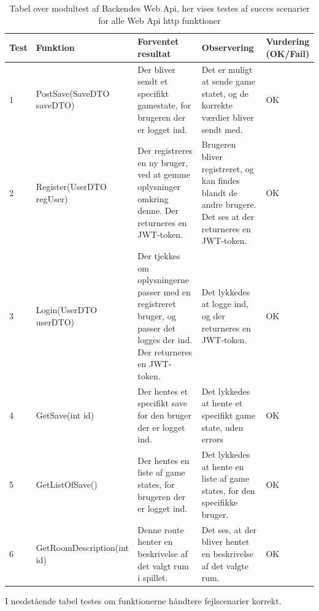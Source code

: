 \begin{table}[H]
\caption{Tabel over modultest af Backendes Web Api, her vises testes af succes scenarier for alle Web Api http funktioner }%
\begin{tabular}{|p{0.75cm}|p{3.6cm}|p{3.5cm}|p{3.5cm}|p{1.9cm}|} \hline
 \textbf{Test} & \textbf{Funktion} & \textbf{Forventet resultat} & \textbf{Observering} & \textbf{Vurdering} \textbf{(OK/Fail)}\\\hline
 1 & PostSave(SaveDTO saveDTO) & Der bliver sendt et specifikt gamestate, for brugeren der er logget ind. & Det er muligt at sende game statet, og de korrekte værdier bliver sendt med. & OK \\ \hline
 2 & Register(UserDTO regUser) & Der registreres en ny bruger, ved at gemme oplysninger omkring denne. Der returneres en JWT-token. & Brugeren bliver registreret, og kan findes blandt de andre brugere. Det ses at der returneres en JWT-token. & OK \\ \hline
 3 & Login(UserDTO userDTO) & Der tjekkes om oplysningerne passer med en registreret bruger, og passer det logges der ind. Der returneres en JWT-token. & Det lykkedes at logge ind, og der returneres en JWT-token.  & OK \\ \hline
 4 & GetSave(int id) & Der hentes et specifikt save for den bruger der er logget ind. & Det lykkedes at hente et specifikt game state, uden errors  & OK \\ \hline
 5 & GetListOfSave() & Der hentes en liste af game states, for brugeren der er logget ind. & Det lykkedes at hente en liste af game states, for den specifikke bruger. & OK \\ \hline
 6 & GetRoomDescription(int id) & Denne route henter en beskrivelse af det valgt rum i spillet. & Det ses, at der bliver hentet en beskrivelse af det valgte rum. & OK \\ \hline
\end{tabular}
\end{table}

I nesdstående tabel testes om funktionerne håndtere fejlscenarier korrekt.

